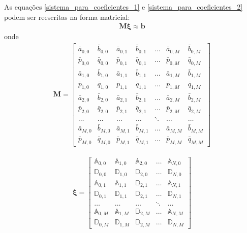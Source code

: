 As equações \eqref{sistema_para_coeficientes_1} e \eqref{sistema_para_coeficientes_2} podem ser reescritas na forma matricial:
\begin{align}
\mathbf{M}\mathbf{\xi} \approx \mathbf{b} \label{sistema_para_coeficientes_3}
\end{align}
onde
\begin{align}
\mathbf{M} =
\begin{bmatrix}
\bar{a}_{0,0} & \bar{b}_{0,0} & \bar{a}_{0,1} & \bar{b}_{0,1} &  \ldots & \bar{a}_{0,M} & \bar{b}_{0,M} \\
\bar{p}_{0,0} & \bar{q}_{0,0} & \bar{p}_{0,1} & \bar{q}_{0,1} &  \ldots & \bar{p}_{0,M} & \bar{q}_{0,M} \\
\bar{a}_{1,0} & \bar{b}_{1,0} & \bar{a}_{1,1} & \bar{b}_{1,1} &  \ldots & \bar{a}_{1,M} & \bar{b}_{1,M} \\
\bar{p}_{1,0} & \bar{q}_{1,0} & \bar{p}_{1,1} & \bar{q}_{1,1} &  \ldots & \bar{p}_{1,M} & \bar{q}_{1,M} \\
\bar{a}_{2,0} & \bar{b}_{2,0} & \bar{a}_{2,1} & \bar{b}_{2,1} &  \ldots & \bar{a}_{2,M} & \bar{b}_{2,M} \\
\bar{p}_{2,0} & \bar{q}_{2,0} & \bar{p}_{2,1} & \bar{q}_{2,1} &  \ldots & \bar{p}_{2,M} & \bar{q}_{2,M} \\
\ldots & \ldots & \ldots & \ldots & \ddots & \ldots & \ldots\\
\bar{a}_{M,0} & \bar{b}_{M,0} & \bar{a}_{M,1} & \bar{b}_{M,1} &  \ldots & \bar{a}_{M,M} & \bar{b}_{M,M} \\
\bar{p}_{M,0} & \bar{q}_{M,0} & \bar{p}_{M,1} & \bar{q}_{M,1} &  \ldots & \bar{p}_{M,M} & \bar{q}_{M,M}
\end{bmatrix}
\end{align}

\begin{align}
\mathbf{\xi}
=
\begin{bmatrix}
\mathbb{A}_{0,0} & \mathbb{A}_{1,0} & \mathbb{A}_{2,0} & \ldots & \mathbb{A}_{N,0} \\
\mathbb{D}_{0,0} & \mathbb{D}_{1,0} & \mathbb{D}_{2,0} & \ldots & \mathbb{D}_{N,0} \\
\mathbb{A}_{0,1} & \mathbb{A}_{1,1} & \mathbb{D}_{2,1} & \ldots & \mathbb{A}_{N,1} \\
\mathbb{D}_{0,1} & \mathbb{D}_{1,1} & \mathbb{D}_{2,1} & \ldots & \mathbb{D}_{N,1} \\
\ldots & \ldots & \ldots & \ddots & \ldots \\
\mathbb{A}_{0,M} & \mathbb{A}_{1,M} & \mathbb{D}_{2,M} & \ldots & \mathbb{A}_{N,M} \\
\mathbb{D}_{0,M} & \mathbb{D}_{1,M} & \mathbb{D}_{2,M} & \ldots & \mathbb{D}_{N,M}
\end{bmatrix}
\end{align}

